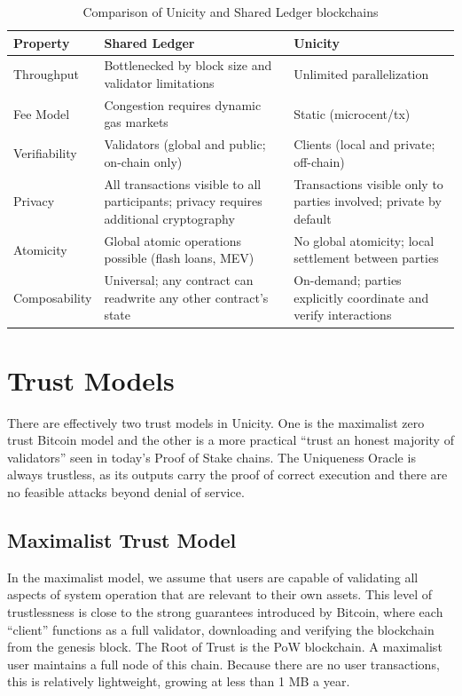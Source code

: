 \documentclass{article}
\begin{document}
\begin{table}[h]
    \centering
    \caption{Comparison of Unicity and Shared Ledger blockchains}
    \label{tab:compshared}
    \begin{tabular}{p{2.5cm}p{5.5cm}p{5.5cm}}
        \toprule
        \textbf{Property} & \textbf{Shared Ledger} & \textbf{Unicity} \\
        \midrule
        Throughput & Bottlenecked by block size and validator limitations  & Unlimited parallelization \\
        \addlinespace
        Fee Model & Congestion requires dynamic gas markets & Static (microcent/tx) \\
        \addlinespace
        Verifiability & Validators (global and public; on-chain only) & Clients (local and private; off-chain) \\
        \addlinespace
        Privacy & All transactions visible to all participants; privacy requires additional cryptography & Transactions visible only to parties involved; private by default \\
        \addlinespace
        Atomicity & Global atomic operations possible (flash loans, MEV) & No global atomicity; local settlement between parties \\
        \addlinespace
        Composability & Universal; any contract can readwrite any other contract's state & On-demand; parties explicitly coordinate and verify interactions \\
        \bottomrule
    \end{tabular}
\end{table}

\section{Trust Models}

There are effectively two trust models in Unicity. One is the maximalist zero trust Bitcoin model and the other is a more practical ``trust an honest majority of validators'' seen in today's Proof of Stake chains. The Uniqueness Oracle is always trustless, as its outputs carry the proof of correct execution and there are no feasible attacks beyond denial of service.

\subsection{Maximalist Trust Model}

In the maximalist model, we assume that users are capable of validating all aspects of system operation that are relevant to their own assets. This level of trustlessness is close to the strong guarantees introduced by Bitcoin, where each ``client'' functions as a full validator, downloading and verifying the blockchain from the genesis block. The Root of Trust is the PoW blockchain. A maximalist user maintains a full node of this chain. Because there are no user transactions, this is relatively lightweight, growing at less than 1 MB a year.
\end{document}
